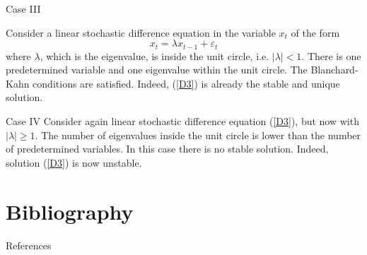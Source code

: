 \documentclass[11pt,aspectratio=169]{beamer}
\begin{document}
\begin{frame}{Case III}
\small

Consider a linear stochastic difference equation in the variable $x_{t}$ of
the form%
\begin{equation}
x_{t}=\lambda x_{t-1}+\varepsilon _{t}  \label{D3}
\end{equation}%
where $\lambda $, which is the eigenvalue, is inside the unit circle, i.e. $%
\left\vert \lambda \right\vert <1$. There is one predetermined variable and
one eigenvalue within the unit circle. The Blanchard-Kahn conditions are
satisfied. Indeed, (\ref{D3}) is already the stable and unique solution.
\end{frame}
\begin{frame}{Case IV}
\small
Consider again linear stochastic difference equation (\ref{D3}), but now
with $\left\vert \lambda \right\vert \geq 1.$ The number of eigenvalues
inside the unit circle is lower than the number of predetermined variables.
In this case there is no stable solution. Indeed, solution (\ref{D3}) is now
unstable.
\begin{center}
\hyperlink{Blanchard}{}
\end{center}
\end{frame}

\section{Bibliography}

\begin{frame}[allowframebreaks]{References}
    \printbibliography %
\end{frame}

\end{document}
